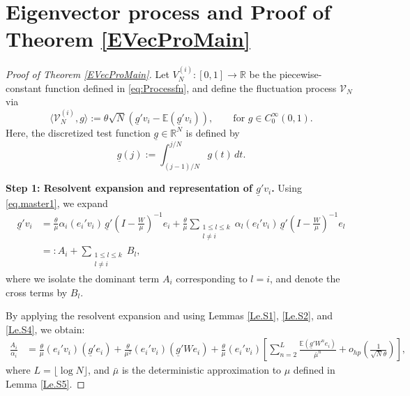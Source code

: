 \documentclass[11pt, reqno]{amsart}
\numberwithin{equation}{section}
\begin{document}
\section{Eigenvector process and Proof of Theorem \ref{EVecProMain}}\label{section:EVprocess}
\begin{proof}[Proof of Theorem \ref{EVecProMain}]
Let \( V_N^{(i)} : [0,1] \to \mathbb{R} \) be the piecewise-constant function defined in \eqref{eq:Processfn}, and define the fluctuation process \( \mathcal{V}_N \) via
\[
\langle \mathcal{V}_N^{(i)}, g \rangle := \theta\sqrt{N} \left( \underline{g}' v_i - \mathbb{E}(\underline{g}' v_i) \right), \qquad \text{for } g \in C_0^\infty(0,1).
\]
Here, the discretized test function \( \underline{g} \in \mathbb{R}^N \) is defined by
\begin{equation}\label{def:lowerg}
\underline{g}(j) := \int_{(j-1)/N}^{j/N} g(t)\,dt.
\end{equation}

\vspace{1em}
\noindent\textbf{Step 1: Resolvent expansion and representation of $\underline{g}'v_i$.} Using \eqref{eq.master1}, we expand
\begin{align*}
\underline{g}' v_i 
&= \frac{\theta}{\mu} \alpha_i (e_i' v_i) \, \underline{g}'\left(I - \frac{W}{\mu}\right)^{-1} e_i 
+ \frac{\theta}{\mu} \sum_{\substack{1 \le l \le k \\ l \ne i}} \alpha_l (e_l' v_i)\, \underline{g}'\left(I - \frac{W}{\mu}\right)^{-1} e_l \\
&=: A_i + \sum_{\substack{1 \le l \le k \\ l \ne i}} B_l,
\end{align*}
where we isolate the dominant term \( A_i \) corresponding to \( l = i \), and denote the cross terms by \( B_l \).

By applying the resolvent expansion and using Lemmas \ref{Le.S1}, \ref{Le.S2}, and \ref{Le.S4}, we obtain:
\begin{align*}
\frac{A_i}{\alpha_i} 
&= \frac{\theta}{\mu}(e_i' v_i)(\underline{g}' e_i) 
+ \frac{\theta}{\mu^2}(e_i' v_i)(\underline{g}' W e_i) 
+ \frac{\theta}{\mu}(e_i' v_i)\left[\sum_{n=2}^L \frac{\mathbb{E}(\underline{g}' W^n e_i)}{\bar{\mu}^n} 
+ o_{hp}\left(\frac{1}{\sqrt{N}\theta}\right)\right],
\end{align*}
where \( L = \lfloor \log N \rfloor \), and \( \bar{\mu} \) is the deterministic approximation to \( \mu \) defined in Lemma \ref{Le.S5}.


\end{proof}
\end{document}
